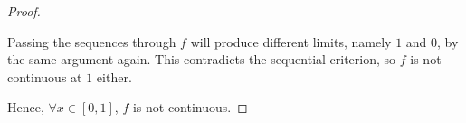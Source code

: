 \documentclass[letterpaper,11pt]{article}
\begin{document}
\begin{proof}
\begin{description}
            Passing the sequences through $f$ will produce different limits,
            namely $1$ and $0$, by the same argument again. This contradicts
            the sequential criterion, so $f$ is not continuous at $1$ either.
    \end{description}

    Hence, $\forall x \in [0, 1]$, $f$ is not continuous.
\end{proof}
\end{document}
